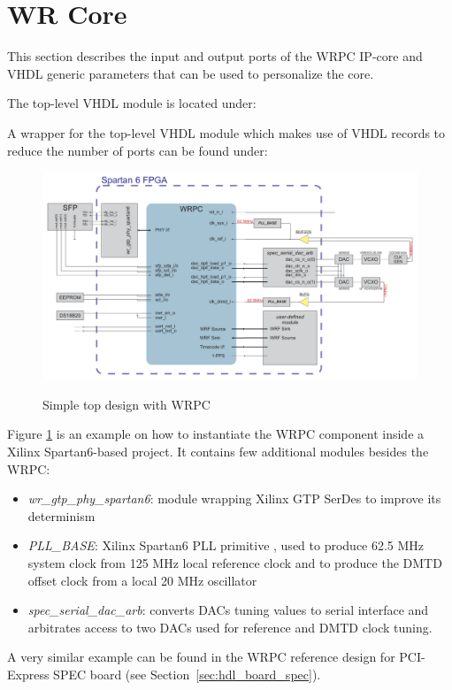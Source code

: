 \section{WR Core}
\label{sec:hdl_wrpc}
This section describes the input and output ports of the WRPC IP-core and VHDL generic parameters
that can be used to personalize the core.

The top-level VHDL module is located under:\\

A wrapper for the top-level VHDL module which makes use of VHDL records to reduce the number of
ports can be found under:\\

\begin{figure}
  \begin{center}
    \includegraphics[width=.9\textheight, angle=270]{fig/basic_top.pdf}
    \label{intro:fig:wrpc_top}
    \caption{Simple top design with WRPC}
  \end{center}
\end{figure}

Figure \ref{intro:fig:wrpc_top} is an example on how to instantiate the WRPC component inside a
Xilinx Spartan6-based project. It contains few additional modules besides the WRPC:
\begin{itemize}
  \item \emph{wr\_gtp\_phy\_spartan6}: module wrapping Xilinx GTP SerDes to improve its determinism
  \item \emph{PLL\_BASE}: Xilinx Spartan6 PLL primitive \cite{pll_base}, used to produce 62.5 MHz
    system clock from 125 MHz local reference clock and to produce the DMTD offset clock from a
    local 20 MHz oscillator
  \item \emph{spec\_serial\_dac\_arb}: converts DACs tuning values to serial interface and
    arbitrates access to two DACs used for reference and DMTD clock tuning.
\end{itemize}

A very similar example can be found in the WRPC reference design for PCI-Express SPEC board (see
Section~\ref{sec:hdl_board_spec}).











